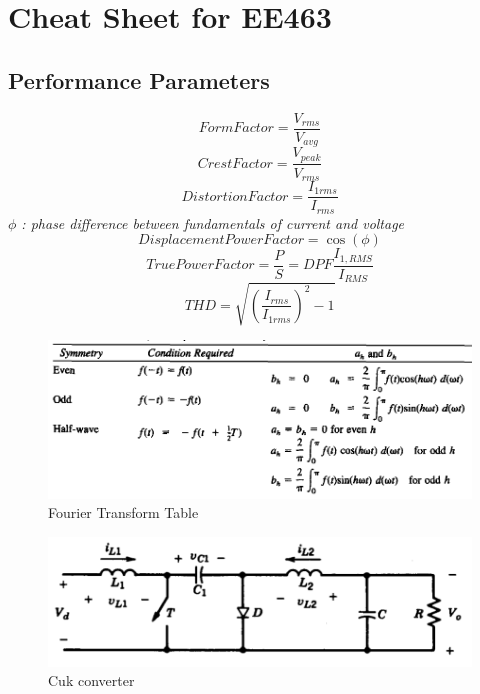 \documentclass[twocolumn, ]{article}
\begin{document}
\section*{\small Cheat Sheet for EE463}

\subsection*{\small Performance Parameters}
\begin{equation*}
Form Factor=\frac{V_{rms}}{V_{avg}}
\end{equation*}
\begin{equation*}
Crest Factor=\frac{V_{peak}}{V_{rms}}
\end{equation*}
\begin{equation*}
Distortion Factor=\frac{I_{1rms}}{I_{rms}}
\end{equation*}
\textit{$\phi$ : phase difference between fundamentals of current and voltage}
\begin{equation*}
Displacement Power Factor=\cos(\phi)
\end{equation*}
\begin{equation*}
True Power Factor=\frac{P}{S}=DPF \frac{I_{1,RMS}}{I_{RMS}}
\end{equation*}
\begin{equation*}
THD=\sqrt{(\frac{I_{rms}}{I_{1rms}})^2-1}
\end{equation*}



  \begin{figure}[!ht]
	\includegraphics[scale=0.30]{Fourier.png}
	\caption{Fourier Transform Table}
\end{figure}

\begin{figure}[!ht]
	\includegraphics[scale=0.20]{cuk_converter.png}
	\caption{Cuk converter}
\end{figure}
\end{document}
